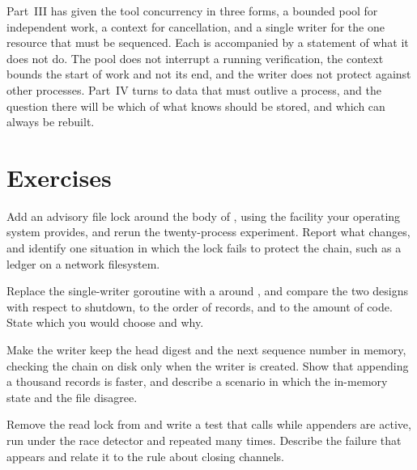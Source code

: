 Part~III has given the tool concurrency in three forms, a bounded pool for independent work, a context for cancellation, and a single writer for the one resource that must be sequenced. Each is accompanied by a statement of what it does not do. The pool does not interrupt a running verification, the context bounds the start of work and not its end, and the writer does not protect against other processes. Part~IV turns to data that must outlive a process, and the question there will be which of what \golab{} knows should be stored, and which can always be rebuilt.

\section*{Exercises}

\begin{exercise}
Add an advisory file lock around the body of , using the facility your operating system provides, and rerun the twenty-process experiment. Report what changes, and identify one situation in which the lock fails to protect the chain, such as a ledger on a network filesystem.
\end{exercise}

\begin{exercise}
Replace the single-writer goroutine with a  around , and compare the two designs with respect to shutdown, to the order of records, and to the amount of code. State which you would choose and why.
\end{exercise}

\begin{exercise}
Make the writer keep the head digest and the next sequence number in memory, checking the chain on disk only when the writer is created. Show that appending a thousand records is faster, and describe a scenario in which the in-memory state and the file disagree.
\end{exercise}

\begin{exercise}
Remove the read lock from  and write a test that calls  while appenders are active, run under the race detector and repeated many times. Describe the failure that appears and relate it to the rule about closing channels.
\end{exercise}
